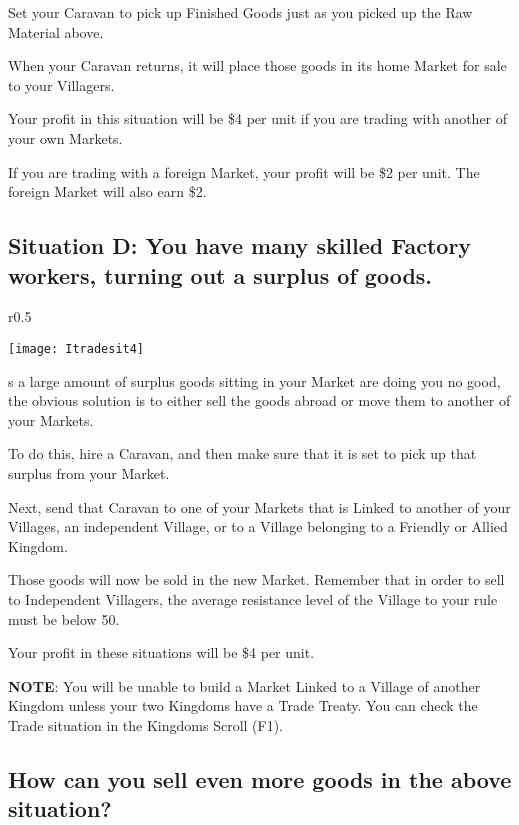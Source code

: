 Set your Caravan to pick up Finished Goods just as you picked up the Raw Material above.

When your Caravan returns, it will place those goods in its home Market for sale to your Villagers.

Your profit in this situation will be \$4 per unit if you are trading with another of your own Markets.

If you are trading with a foreign Market, your profit will be \$2 per unit. The foreign Market will also earn \$2.

\clearpage

\subsection{Situation D: You have many skilled Factory workers, turning out a surplus of goods.}

\begin{wrapfigure}{r}{0.5\textwidth}
	\vspace{-20pt}
	\begin{center}
		\texttt{[image: Itradesit4]} %
	\end{center}
	\vspace{-20pt}
\end{wrapfigure}

s a large amount of surplus goods sitting in your Market are doing you no good, the obvious solution is to either sell the goods abroad or move them to another of your Markets.

To do this, hire a Caravan, and then make sure that it is set to pick up that surplus from your Market.

Next, send that Caravan to one of your Markets that is Linked to another of your Villages, an independent Village, or to a Village belonging to a Friendly or Allied Kingdom.

Those goods will now be sold in the new Market. Remember that in order to sell to Independent Villagers, the average resistance level of the Village to your rule must be below 50.

Your profit in these situations will be \$4 per unit.

\textbf{NOTE}: You will be unable to build a Market Linked to a Village of another Kingdom unless your two Kingdoms have a Trade Treaty. You can check the Trade situation in the Kingdoms Scroll (F1).

\subsection{How can you sell even more goods in the above situation?}

